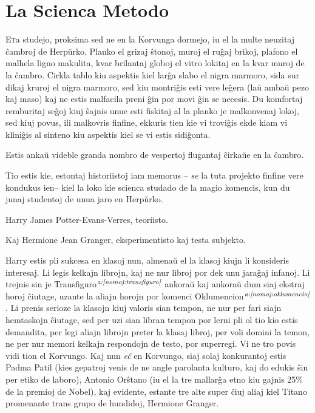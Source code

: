 \chapter{La Scienca Metodo}

\lettrine{E}ta studejo, proksima sed ne en la Korvunga dormejo, iu el
la multe neuzitaj ĉambroj de Herpŭrko. Planko el grizaj ŝtonoj, muroj
el ruĝaj brikoj, plafono el malhela ligno makulita, kvar brilantaj
globoj el vitro lokitaj en la kvar muroj de la ĉambro. Cirkla tablo
kiu aspektis kiel larĝa slabo el nigra marmoro, sida sur dikaj kruroj
el nigra marmoro, sed kiu montriĝis esti vere leĝera (laŭ ambaŭ pezo
kaj maso) kaj ne estis malfacila preni ĝin por movi ĝin se necesis. Du
komfortaj remburitaj seĝoj kiuj ŝajnis unue esti fiskitaj al la planko
je malkonvenaj lokoj, sed kiuj povus, ili malkovris finfine, ekkuris
tien kie vi troviĝis ekde kiam vi kliniĝis al sinteno kiu aspektis
kiel se vi estis sidiĝonta.


Estis ankaŭ videble granda nombro de vespertoj flugantaj ĉirkaŭe en la
ĉambro.

Tio estis kie, estontaj historiistoj iam memorus -- \emph{se} la tuta
projekto finfine vere kondukus ien-- kiel la loko kie scienca studado
de la magio komencis, kun du junaj studentoj de unua jaro en Herpŭrko.

Harry James Potter-Evans-Verres, teoriisto.

Kaj Hermione Jean Granger, eksperimentisto kaj testa subjekto.

Harry estis pli sukcesa en klasoj nun, almenaŭ el la klasoj kiujn li
konsideris interesaj. Li legis kelkajn librojn, kaj ne nur libroj por
dek unu jaraĝaj infanoj. Li trejnis sin je
Transfiguro$^{\textit{a:\ref{nomoj:transfiguro}}}$ ankoraŭ kaj ankoraŭ
dum siaj ekstraj horoj ĉiutage, uzante la aliajn horojn por komenci
Oklumencion$^{\textit{a:\ref{nomoj:oklumencio}}}$. Li prenis serioze
la klasojn kiuj valoris sian tempon, ne nur per fari siajn hemtaskojn
ĉiutage, sed per uzi sian libran tempon por lerni pli ol tio kio estis
demandita, per legi aliajn librojn preter la klasaj libroj, per voli
domini la temon, ne per nur memori kelkajn respondojn de testo,
por superregi. Vi ne tro povis vidi tion el Korvungo. Kaj nun
\emph{eĉ} en Korvungo, siaj solaj konkurantoj estis Padma Patil (kies
gepatroj venis de ne angle parolanta kulturo, kaj do edukis ŝin per
etiko de laboro), Antonio Orŝtano (iu el la tre mallarĝa etno kiu
gajnis 25\% de la premioj de Nobel), kaj evidente, estante tre alte
super ĉiuj aliaj kiel Titano promenante trans grupo de hundidoj,
Hermione Granger.

